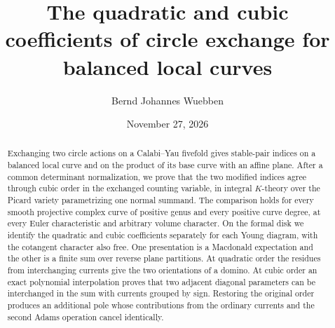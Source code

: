 \documentclass[11pt]{amsart}
\title[Quadratic and cubic circle exchange]{The quadratic and cubic coefficients of circle exchange for balanced local curves}
\author{Bernd Johannes Wuebben}
\date{November 27, 2026}
\theoremstyle{definition}
\theoremstyle{remark}\newtheorem{remark}[theorem]{Remark}
\begin{document}
\begin{abstract}
Exchanging two circle actions on a Calabi--Yau fivefold gives stable-pair indices on a balanced local curve and on the product of its base curve with an affine plane. After a common determinant normalization, we prove that the two modified indices agree through cubic order in the exchanged counting variable, in integral $K$-theory over the Picard variety parametrizing one normal summand. The comparison holds for every smooth projective complex curve of positive genus and every positive curve degree, at every Euler characteristic and arbitrary volume character. On the formal disk we identify the quadratic and cubic coefficients separately for each Young diagram, with the cotangent character also free. One presentation is a Macdonald expectation and the other is a finite sum over reverse plane partitions. At quadratic order the residues from interchanging currents give the two orientations of a domino. At cubic order an exact polynomial interpolation proves that two adjacent diagonal parameters can be interchanged in the sum with currents grouped by sign. Restoring the original order produces an additional pole whose contributions from the ordinary currents and the second Adams operation cancel identically.
\end{abstract}
\maketitle






\end{document}
